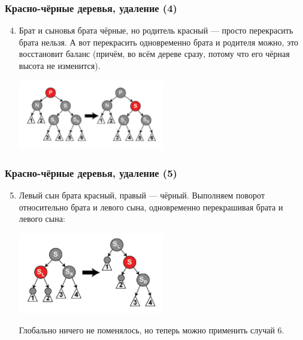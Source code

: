 \documentclass[xetex,mathserif,serif]{beamer}
\begin{document}
    \begin{frame}
        \frametitle{Красно-чёрные деревья, удаление (4)}
        \begin{enumerate}
            \setcounter{enumi}{3}
            \item Брат и сыновья брата чёрные, но родитель красный --- просто перекрасить брата нельзя. А вот перекрасить одновременно брата и родителя можно, это восстановит баланс (причём, во всём дереве сразу, потому что его чёрная высота не изменится).
            \begin{center}
                \includegraphics[width=0.5\textwidth]{deletion-from-red-black-tree3.png}
            \end{center}
        \end{enumerate}
    \end{frame}

    \begin{frame}
        \frametitle{Красно-чёрные деревья, удаление (5)}
        \begin{enumerate}
            \setcounter{enumi}{4}
            \item Левый сын брата красный, правый --- чёрный. Выполняем поворот относительно брата и левого сына, одновременно перекрашивая брата и левого сына:
            \begin{center}
                \includegraphics[width=0.5\textwidth]{deletion-from-red-black-tree4.png}
            \end{center}
            Глобально ничего не поменялось, но теперь можно применить случай 6.
        \end{enumerate}
    \end{frame}
\end{document}

